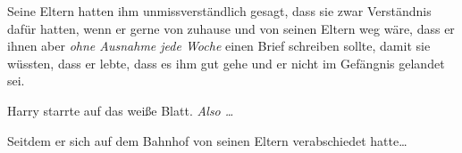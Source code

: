 Seine Eltern hatten ihm unmissverständlich gesagt, dass sie zwar Verständnis dafür hatten, wenn er gerne von zuhause und von seinen Eltern weg wäre, dass er ihnen aber \emph{ohne Ausnahme jede Woche} einen Brief schreiben sollte, damit sie wüssten, dass er lebte, dass es ihm gut gehe und er nicht im Gefängnis gelandet sei.

Harry starrte auf das weiße Blatt. \emph{Also …}

Seitdem er sich auf dem Bahnhof von seinen Eltern verabschiedet hatte…

